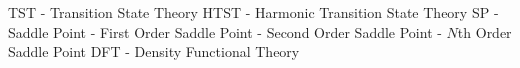 TST - Transition State Theory
HTST - Harmonic Transition State Theory
SP - Saddle Point
 - First Order Saddle Point
 - Second Order Saddle Point
 - $N$th Order Saddle Point
DFT - Density Functional Theory
